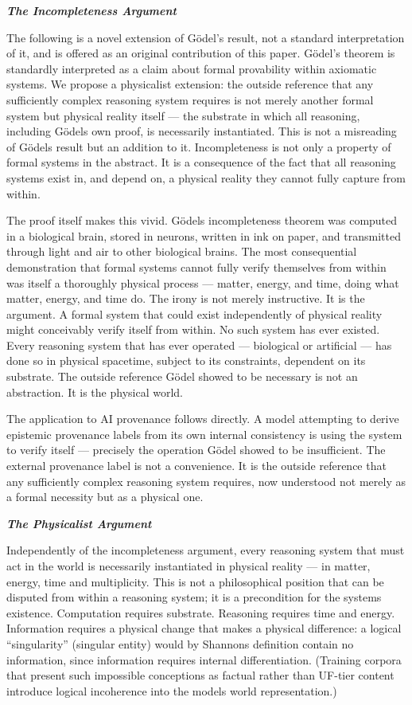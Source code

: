 \documentclass[12pt]{article}
\begin{document}
\emph{\textbf{The Incompleteness Argument}}

The following is a novel extension of Gödel's result, not a standard
interpretation of it, and is offered as an original contribution of this
paper. Gödel's theorem is standardly interpreted as a claim about formal
provability within axiomatic systems. We propose a physicalist
extension: the outside reference that any sufficiently complex reasoning
system requires is not merely another formal system but physical reality
itself --- the substrate in which all reasoning, including
Gödel\textquotesingle s own proof, is necessarily instantiated. This is
not a misreading of Gödel\textquotesingle s result but an addition to
it. Incompleteness is not only a property of formal systems in the
abstract. It is a consequence of the fact that all reasoning systems
exist in, and depend on, a physical reality they cannot fully capture
from within.

The proof itself makes this vivid. Gödel\textquotesingle s
incompleteness theorem was computed in a biological brain, stored in
neurons, written in ink on paper, and transmitted through light and air
to other biological brains. The most consequential demonstration that
formal systems cannot fully verify themselves from within was itself a
thoroughly physical process --- matter, energy, and time, doing what
matter, energy, and time do. The irony is not merely instructive. It is
the argument. A formal system that could exist independently of physical
reality might conceivably verify itself from within. No such system has
ever existed. Every reasoning system that has ever operated ---
biological or artificial --- has done so in physical spacetime, subject
to its constraints, dependent on its substrate. The outside reference
Gödel showed to be necessary is not an abstraction. It is the physical
world.

The application to AI provenance follows directly. A model attempting to
derive epistemic provenance labels from its own internal consistency is
using the system to verify itself --- precisely the operation Gödel
showed to be insufficient. The external provenance label is not a
convenience. It is the outside reference that any sufficiently complex
reasoning system requires, now understood not merely as a formal
necessity but as a physical one.

\emph{\textbf{The Physicalist Argument}}

Independently of the incompleteness argument, every reasoning system
that must act in the world is necessarily instantiated in physical
reality --- in matter, energy, time and multiplicity. This is not a
philosophical position that can be disputed from within a reasoning
system; it is a precondition for the system\textquotesingle s existence.
Computation requires substrate. Reasoning requires time and energy.
Information requires a physical change that makes a physical difference:
a logical ``singularity'' (singular entity) would by
Shannon\textquotesingle s definition contain no information, since
information requires internal differentiation. (Training corpora that
present such impossible conceptions as factual rather than UF-tier
content introduce logical incoherence into the model\textquotesingle s
world representation.)
\end{document}
